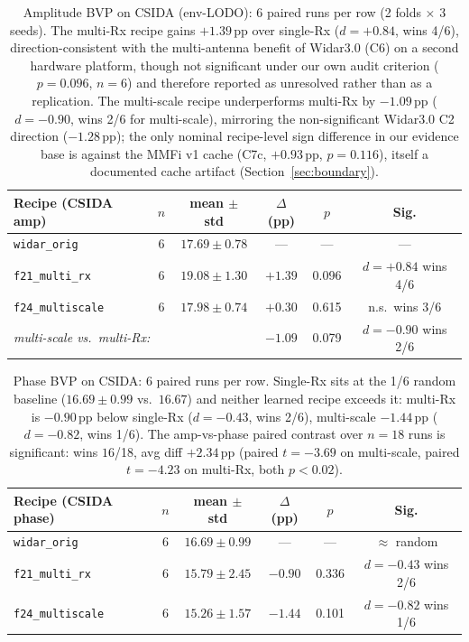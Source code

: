 \documentclass[11pt]{article}
\theoremstyle{definition}
\begin{document}
\begin{table}[!h]
    \centering
    \caption{Amplitude BVP on CSIDA (env-LODO): 6 paired runs per row (2 folds $\times$ 3 seeds). The multi-Rx recipe gains $+1.39$\,pp over single-Rx ($d{=}+0.84$, wins 4/6), direction-consistent with the multi-antenna benefit of Widar3.0 (C6) on a second hardware platform, though not significant under our own audit criterion ($p = 0.096$, $n = 6$) and therefore reported as unresolved rather than as a replication. The multi-scale recipe underperforms multi-Rx by $-1.09$\,pp ($d{=}-0.90$, wins 2/6 for multi-scale), mirroring the non-significant Widar3.0 C2 direction ($-1.28$\,pp); the only nominal recipe-level sign difference in our evidence base is against the MMFi v1 cache (C7c, $+0.93$\,pp, $p = 0.116$), itself a documented cache artifact (Section~\ref{sec:boundary}).}
    \label{tab:ddopt-csida-amp}
    \scriptsize
    \setlength{\tabcolsep}{4pt}
    \begin{tabular}{lccccc}
    \toprule
    Recipe (CSIDA amp) & $n$ & mean $\pm$ std & $\Delta$(pp) & $p$ & Sig. \\
    \midrule
    \texttt{widar\_orig}     & 6 & $17.69 \pm 0.78$ & ---        & ---  & --- \\
    \texttt{f21\_multi\_rx}  & 6 & $\mathbf{19.08 \pm 1.30}$ & $+1.39$  & 0.096 & $d{=}+0.84$ wins 4/6 \\
    \texttt{f24\_multiscale} & 6 & $17.98 \pm 0.74$ & $+0.30$   & 0.615 & n.s.\ wins 3/6 \\
    \midrule
    \multicolumn{3}{l}{\emph{multi-scale vs.\ multi-Rx:}} & $-1.09$ & 0.079 & $d{=}-0.90$ wins 2/6 \\
    \bottomrule
    \end{tabular}
\end{table}

\begin{table}[!h]
    \centering
    \caption{Phase BVP on CSIDA: 6 paired runs per row. Single-Rx sits at the 1/6 random baseline ($16.69 \pm 0.99$ vs.\ $16.67$) and neither learned recipe exceeds it: multi-Rx is $-0.90$\,pp below single-Rx ($d{=}-0.43$, wins 2/6), multi-scale $-1.44$\,pp ($d{=}-0.82$, wins 1/6). The amp-vs-phase paired contrast over $n{=}18$ runs is significant: wins $16$/18, avg diff $+2.34$\,pp (paired $t{=}{-}3.69$ on multi-scale, paired $t{=}{-}4.23$ on multi-Rx, both $p < 0.02$).}
    \label{tab:ddopt-csida-phase}
    \scriptsize
    \setlength{\tabcolsep}{4pt}
    \begin{tabular}{lccccc}
    \toprule
    Recipe (CSIDA phase) & $n$ & mean $\pm$ std & $\Delta$(pp) & $p$ & Sig. \\
    \midrule
    \texttt{widar\_orig}     & 6 & $16.69 \pm 0.99$ & ---        & ---  & $\approx$ random \\
    \texttt{f21\_multi\_rx}  & 6 & $15.79 \pm 2.45$ & $-0.90$   & 0.336 & $d{=}-0.43$ wins 2/6 \\
    \texttt{f24\_multiscale} & 6 & $\mathbf{15.26 \pm 1.57}$ & $-1.44$ & 0.101 & $d{=}-0.82$ wins 1/6 \\
    \bottomrule
    \end{tabular}
\end{table}
\end{document}
